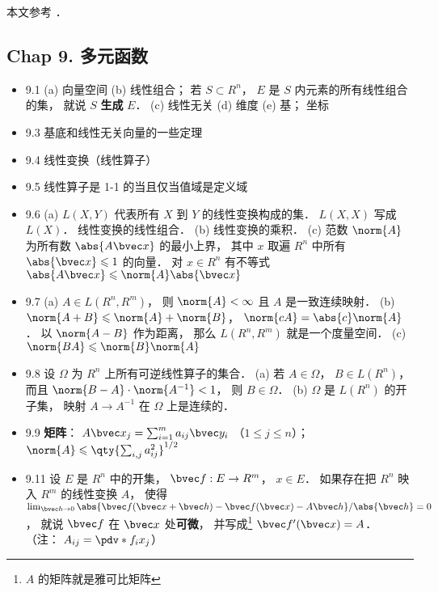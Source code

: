 
本文参考 \cite{Rudin}．

\subsection{Chap 9. 多元函数}

\begin{itemize}
\item 9.1 (a) 向量空间 (b) 线性组合； 若 $S \subset R^n$， $E$ 是 $S$ 内元素的所有线性组合的集， 就说 $S$ \textbf{生成} $E$． (c) 线性无关 (d) 维度 (e) 基； 坐标

\item 9.3 基底和线性无关向量的一些定理

\item 9.4 线性变换（线性算子）

\item 9.5 线性算子是 1-1 的当且仅当值域是定义域

\item 9.6 (a) $L(X,Y)$ 代表所有 $X$ 到 $Y$ 的线性变换构成的集． $L(X,X)$ 写成 $L(X)$． 线性变换的线性组合． (b) 线性变换的乘积． (c) 范数 $\norm{A}$ 为所有数 $\abs{A\bvec x}$ 的最小上界， 其中 $x$ 取遍 $R^n$ 中所有 $\abs{\bvec x}\leqslant 1$ 的向量． 对 $x\in R^n$ 有不等式 $\abs{A\bvec x}\leqslant \norm{A}\abs{\bvec x}$

\item 9.7 (a) $A\in L(R^n,R^m)$， 则 $\norm{A}<\infty$ 且 $A$ 是一致连续映射． (b) $\norm{A+B}\leqslant \norm{A}+\norm{B}$， $\norm{cA} = \abs{c}\norm{A}$． 以 $\norm{A-B}$ 作为距离， 那么 $L(R^n,R^m)$ 就是一个度量空间． (c) $\norm{BA} \leqslant \norm{B}\norm{A}$

\item 9.8 设 $\Omega$ 为 $R^n$ 上所有可逆线性算子的集合． (a) 若 $A\in\Omega$， $B\in L(R^n)$， 而且 $\norm{B-A}\cdot\norm{A^{-1}}<1$， 则 $B\in \Omega$． (b) $\Omega$ 是 $L(R^n)$ 的开子集， 映射 $A\to A^{-1}$ 在 $\Omega$ 上是连续的．

\item 9.9 \textbf{矩阵}： $A\bvec x_j = \sum_{i=1}^m a_{ij}\bvec y_i$ （$1\leqslant j\leqslant n$）； $\norm{A}\leqslant \qty{\sum_{i,j}a_{ij}^2}^{1/2}$

\item 9.11 设 $E$ 是 $R^n$ 中的开集， $\bvec f: E\to R^m$， $x\in E$． 如果存在把 $R^n$ 映入 $R^m$ 的线性变换 $A$， 使得 $\lim_{\bvec h\to 0} \abs{\bvec f(\bvec x+\bvec h) - \bvec f(\bvec x) - A\bvec h}/{\abs{\bvec h}} = 0$， 就说 $\bvec f$ 在 $\bvec x$ 处\textbf{可微}， 并写成\footnote{$A$ 的矩阵就是雅可比矩阵} $\bvec f'(\bvec x) = A$． （注： $A_{ij} = \pdv*{f_i}{x_j}$）


\end{itemize}
